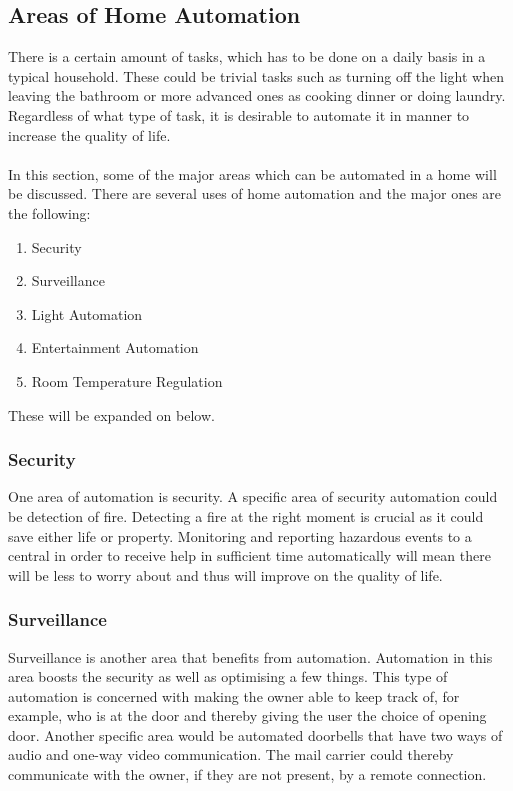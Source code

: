 \subsection{Areas of Home Automation}
\label{sec:Areas of Home Automation}
There is a certain amount of tasks, which has to be done on a daily basis in a typical household. These could be trivial tasks such as turning off the light when leaving the bathroom or more advanced ones as cooking dinner or doing laundry. Regardless of what type of task, it is desirable to automate it in manner to increase the quality of life.
\\\\
In this section, some of the major areas which can be automated in a home will be discussed. There are several uses of home automation and the major ones are the following:

\begin{enumerate}
  \item Security
  \item Surveillance
  \item Light Automation
  \item Entertainment Automation
  \item Room Temperature Regulation
\end{enumerate}
These will be expanded on below.

\subsubsection{Security}
\label{sub:Security}
One area of automation is security. A specific area of security automation could be detection of fire. Detecting a fire at the right moment is crucial as it could save either life or property. Monitoring and reporting hazardous events to a central in order to receive help in sufficient time automatically will mean there will be less to worry about and thus will improve on the quality of life.

\subsubsection{Surveillance} 
\label{sub:Surveillance}
\label{sub:Surveillance}
Surveillance is another area that benefits from automation. Automation in this area boosts the security as well as optimising a few things. This type of automation is concerned with making the owner able to keep track of, for example, who is at the door and thereby giving the user the choice of opening door. Another specific area would be automated doorbells that have two ways of audio and one-way video communication. The mail carrier could thereby communicate with the owner, if they are not present, by a remote connection.

